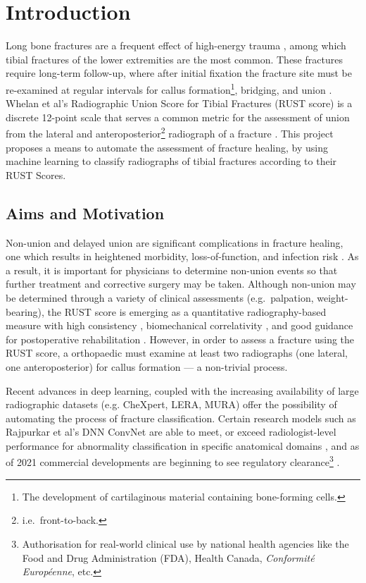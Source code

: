 

\chapter{Introduction}
Long bone fractures are a frequent effect of high-energy trauma \autocite{HStein1999}, among which tibial fractures of the lower extremities are the most common. These fractures require long-term follow-up, where after initial fixation the fracture site must be re-examined at regular intervals for callus formation\footnote{The development of cartilaginous material containing bone-forming cells.}, bridging, and union \autocite{Jones2020}. Whelan et al's Radiographic Union Score for Tibial Fractures (RUST score) is a discrete 12-point scale that serves a common metric for the assessment of union from the lateral and anteroposterior\footnote{i.e.\ front-to-back.} radiograph of a fracture \autocite{Whelan2010}. This project proposes a means to automate the assessment of fracture healing, by using machine learning to classify radiographs of tibial fractures according to their RUST Scores.

\section{Aims and Motivation}

Non-union and delayed union are significant complications in fracture healing, one which results in heightened morbidity, loss-of-function, and infection risk \autocite{Nicholson2021}. As a result, it is important for physicians to determine non-union events so that further treatment and corrective surgery may be taken. Although non-union may be determined through a variety of clinical assessments (e.g.\ palpation, weight-bearing), the RUST score is emerging as a quantitative radiography-based measure with high consistency \autocite{Panchoo2022}, biomechanical correlativity \autocite{Cook2018}, and good guidance for postoperative rehabilitation \autocite{Debuka2019}. However, in order to assess a fracture using the RUST score, a orthopaedic must examine at least two radiographs (one lateral, one anteroposterior) for callus formation --- a non-trivial process.

Recent advances in deep learning, coupled with the increasing availability of large radiographic datasets (e.g. CheXpert, LERA, MURA) \autocites{CheXpert2019}{LERA}{MURA2017} offer the possibility of automating the process of fracture classification. Certain research models such as Rajpurkar et al's DNN ConvNet are able to meet, or exceed radiologist-level performance for abnormality classification in specific anatomical domains \autocite{MURA2017}, and as of 2021 commercial developments are beginning to see regulatory clearance\footnote{Authorisation for real-world clinical use by national health agencies like the Food and Drug Administration (FDA), Health Canada, \emph{Conformité Européenne}, etc.} \autocite{Adams2021}.


